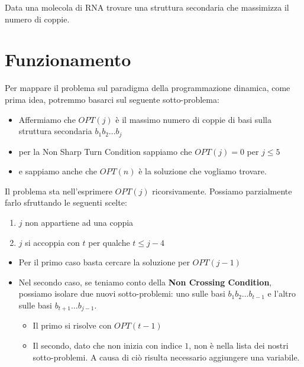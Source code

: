 Data una molecola di RNA trovare una struttura secondaria che massimizza
il numero di coppie.

\section{Funzionamento}

Per mappare il problema sul paradigma della programmazione dinamica,
come prima idea, potremmo basarci sul seguente sotto-problema:
\begin{myblockquote}
  \begin{itemize}
    \item Affermiamo che $OPT(j)$ è il massimo numero di coppie
          di basi sulla struttura secondaria $b_1 b_2 \ldots b_j$
    \item per la Non Sharp Turn Condition sappiamo che
          $OPT(j) = 0$ per $j \leq 5$
    \item e sappiamo anche che
          $OPT(n)$ è la soluzione che vogliamo trovare.
  \end{itemize}
\end{myblockquote}


Il problema sta nell'esprimere $OPT(j)$ ricorsivamente. Possiamo
parzialmente farlo sfruttando le seguenti scelte:
\begin{enumerate}
  \item $j$ non appartiene ad una coppia
  \item $j$ si accoppia con $t$ per qualche $t \leq j - 4$
\end{enumerate}
\begin{itemize}
  \item
        Per il primo caso basta cercare la soluzione per $OPT(j - 1)$
  \item
        Nel secondo caso, se teniamo conto della \textbf{Non Crossing
          Condition}, possiamo isolare due nuovi sotto-problemi: uno sulle basi
        $b_1 b_2 \ldots b_{t-1}$ e l'altro sulle basi
        $b_{t+1} \ldots b_{j-1}$.

        \begin{itemize}
          \item
                Il primo si risolve con $OPT(t-1)$
          \item
                Il secondo, dato che non inizia con indice $1$, non è nella lista
                dei nostri sotto-problemi. A causa di ciò risulta necessario
                aggiungere una variabile.
        \end{itemize}
\end{itemize}


